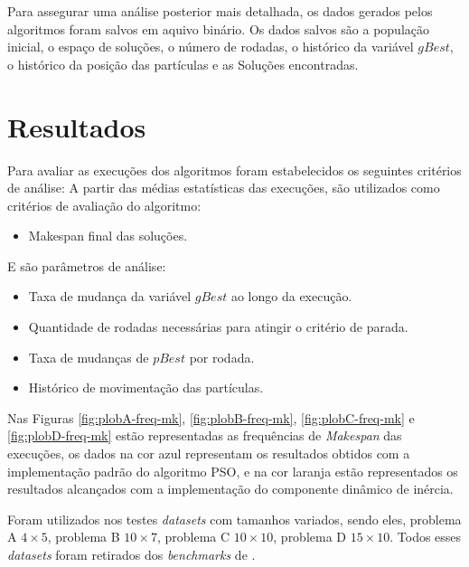 Para assegurar uma análise posterior mais detalhada, os dados gerados pelos algoritmos foram salvos em aquivo binário.
Os dados salvos são a população inicial, o espaço de soluções, o número de rodadas, o histórico da variável $gBest$, o histórico da posição das partículas e as Soluções encontradas.
\section{Resultados}
Para avaliar as execuções dos algoritmos foram estabelecidos os seguintes critérios de análise:
A partir das médias estatísticas das execuções, são utilizados como critérios de avaliação do algoritmo:
\begin{itemize}
\item Makespan final das soluções.
\end{itemize}

\noindent E são parâmetros de análise:
\begin{itemize}
\item Taxa de mudança da variável $gBest$ ao longo da execução.
\item Quantidade de rodadas necessárias para atingir o critério de parada.
\item Taxa de mudanças de $pBest$ por rodada.
\item Histórico de movimentação das partículas.
\end{itemize}

Nas Figuras \ref{fig:plobA-freq-mk}, \ref{fig:plobB-freq-mk}, \ref{fig:plobC-freq-mk} e \ref{fig:plobD-freq-mk} 
estão representadas as frequências de \textit{Makespan} das execuções, os dados na cor azul representam os resultados obtidos com a implementação padrão do algoritmo PSO, e na cor laranja estão representados os resultados alcançados com a implementação do componente dinâmico de inércia.

Foram utilizados nos testes \textit{datasets} com tamanhos variados, sendo eles, 
problema A $4 \times 5$,
problema B $10 \times 7$,
problema C $10 \times 10$,
problema D $15 \times 10$.
Todos esses \textit{datasets} foram retirados dos \textit{benchmarks} de \cite{Kacem2002}.
%


